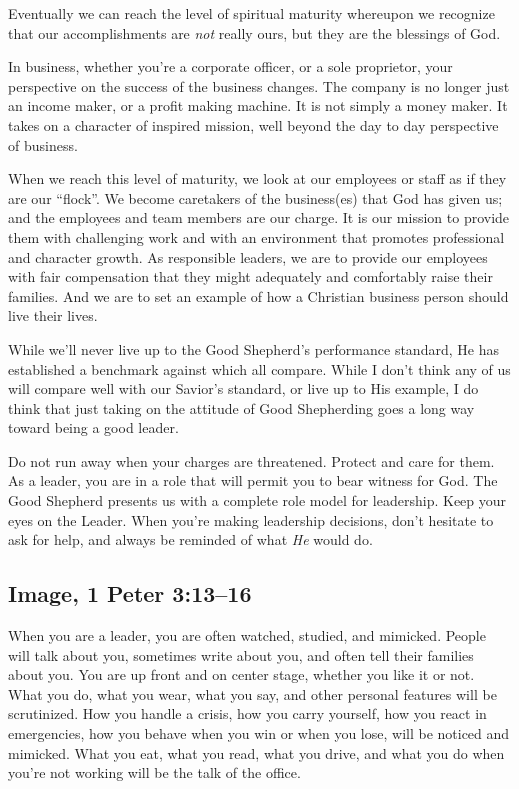 \documentclass[12pt]{memoir}
\begin{document}
Eventually we can reach the level of spiritual maturity whereupon we recognize that our accomplishments are \emph{not} really ours, but they are the blessings of God.

In business, whether you're a corporate officer, or a sole proprietor, your perspective on the success of the business changes.
The company is no longer just an income maker, or a profit making machine.
It is not simply a money maker.
It takes on a character of inspired mission, well beyond the day to day perspective
of business.

When we reach this level of maturity, we look at our
employees or staff as if they are our ``flock''. We become caretakers
of the business(es) that God has given us; and the employees and team
members are our charge. It is our mission to provide them with challenging
work and with an environment that promotes professional and character growth. As responsible leaders, we are to provide our employees with fair compensation that they might adequately and comfortably raise their families. And we are to set an example of how a Christian business person should live their lives. 

While we'll never live up to the Good Shepherd's performance standard,
He has established a benchmark against which all compare. While I don't
think any of us will compare well with our Savior's standard, or
live up to His example, I do think that just taking on the attitude
of Good Shepherding goes a long way toward being a good leader.

Do not run away when your charges are threatened.
Protect and care for them.
As a leader, you are in a role that will permit you to bear witness for God.
The Good Shepherd presents us with a complete role model for leadership. Keep your eyes on the Leader. When you're making leadership decisions, don't hesitate to ask for help, and always be reminded
of what \emph{He} would do.

\subsection[Image]{Image, 1 Peter 3:13--16}

When you are a leader, you are often watched, studied, and mimicked.
People will talk about you, sometimes write about you, and often tell
their families about you. You are up front and on center stage, whether
you like it or not. What you do, what you wear, what you say, and
other personal features will be scrutinized. How you handle a crisis,
how you carry yourself, how you react in emergencies, how you behave
when you win or when you lose, will be noticed and mimicked. What
you eat, what you read, what you drive, and what you do when you're
not working will be the talk of the office.
\end{document}
